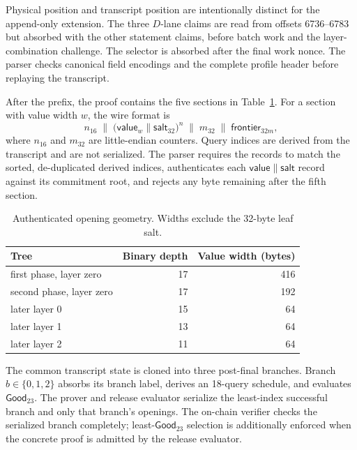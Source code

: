 Physical position and transcript position are intentionally distinct for the
append-only extension.  The three \(D\)-lane claims are read from offsets
6736--6783 but absorbed with the other statement claims, before batch work and
the layer-combination challenge.  The selector is absorbed after the final
work nonce.  The parser checks canonical field encodings and the complete
profile header before replaying the transcript.

After the prefix, the proof contains the five sections in
Table~\ref{tab:opening-geometry}.  For a section with value width \(w\), the
wire format is
\[
  n_{16}\;\mathbin\|\;
  \bigl(\mathsf{value}_{w}\mathbin\|\mathsf{salt}_{32}\bigr)^n
  \;\mathbin\|\;m_{32}\;\mathbin\|\;
  \mathsf{frontier}_{32m},
\]
where \(n_{16}\) and \(m_{32}\) are little-endian counters.  Query indices are
derived from the transcript and are not serialized.  The parser requires the
records to match the sorted, de-duplicated derived indices, authenticates each
\(\mathsf{value}\mathbin\|\mathsf{salt}\) record against its commitment root,
and rejects any byte remaining after the fifth section.

\begin{table}[t]
  \centering
  \small
  \caption{Authenticated opening geometry.  Widths exclude the 32-byte leaf
  salt.}
  \label{tab:opening-geometry}
  \begin{tabular}{l r r}
    \toprule
    Tree & Binary depth & Value width (bytes) \\
    \midrule
    first phase, layer zero  & 17 & 416 \\
    second phase, layer zero & 17 & 192 \\
    later layer 0            & 15 & 64  \\
    later layer 1            & 13 & 64  \\
    later layer 2            & 11 & 64  \\
    \bottomrule
  \end{tabular}
\end{table}

The common transcript state is cloned into three post-final branches.  Branch
\(b\in\{0,1,2\}\) absorbs its branch label, derives an 18-query schedule, and
evaluates \(\mathsf{Good}_{23}\).  The prover and release evaluator serialize the
least-index successful branch and only that branch's openings.  The on-chain
verifier checks the serialized branch completely; least-\(\mathsf{Good}_{23}\)
selection is additionally enforced when the concrete proof is admitted by the
release evaluator.

